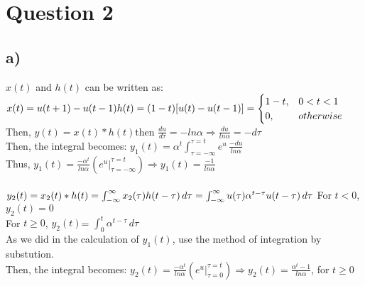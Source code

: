 \documentclass[12pt]{article}
\begin{document}
    \section*{Question 2}
    \subsection*{a)}
	\(x(t)\) and \(h(t)\) can be written as: \\
    \begin{math}
      x(t) = u(t+1)-u(t-1) \\
      h(t) =  (1-t)[u(t)-u(t-1)] = \begin{cases}
      1-t,& 0<t<1 \\
      0,& otherwise
    \end{cases} \end{math}\\
      Then, \begin{math}y(t) = x(t)*h(t)\end{math}then \begin{math}\frac{du}{d\tau} = -ln\alpha \Rightarrow  \frac{du}{ln\alpha} = -d\tau \end{math}\\
      Then, the integral becomes: \begin{math} y_1(t) = \alpha^{t}\int_{\tau = -\infty}^{\tau = t} e^{u} \,\frac{-du}{ln\alpha} \end{math} \\
       Thus, \begin{math} y_1(t) =  \frac{-\alpha^{t}}{ln\alpha} \left (e^{u}\Big|_{\tau=-\infty}^{\tau=t}\right )  \Rightarrow  y_1(t) =  \frac{-1}{ln\alpha}
    \end{math}\\ \\
    \begin{math}
     y_2(t) = x_2(t)*h(t) = \int_{-\infty}^{\infty} x_2(\tau)h(t-\tau) \,d\tau = \int_{-\infty}^{\infty} u(\tau)\alpha^{t-\tau}u(t-\tau) \,d\tau \\ 
    \end{math}
    For \(t < 0\), \(y_2(t) = 0\)\\
    For \(t \geq 0\), \(y_2(t)\)= \begin{math} \int_{0}^{t} \alpha^{t-\tau} \,d\tau \end{math}\\
    As we did in the calculation of \(y_1(t)\), use the method of integration by substution.\\  
      Then, the integral becomes: \begin{math} y_2(t) = \frac{-\alpha^{t}}{ln\alpha} \left (e^{u}\Big|_{\tau=0}^{\tau=t}\right )  \Rightarrow  y_2(t)  = \frac{\alpha^t-1}{ln\alpha} \end{math}, for \(t \geq 0\) \\
\end{document}
